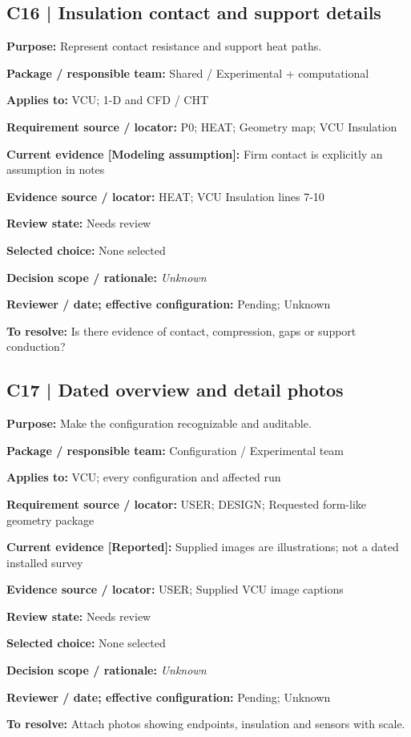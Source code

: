 \documentclass[11pt]{article}
\begin{document}
\begin{minipage}{\textwidth}\small\setlength{\parskip}{2pt}
\subsection*{C16 | Insulation contact and support details}
\textbf{Purpose:} Represent contact resistance and support heat paths.\par
\textbf{Package / responsible team:} Shared / Experimental + computational\par
\textbf{Applies to:} VCU; 1-D and CFD / CHT\par
\textbf{Requirement source / locator:} P0; HEAT; Geometry map; VCU Insulation\par
\textbf{Current evidence [Modeling assumption]:} Firm contact is explicitly an assumption in notes\par
\textbf{Evidence source / locator:} HEAT; VCU Insulation lines 7-10\par
\textbf{Review state:} Needs review\par
\textbf{Selected choice:} None selected\par
\textbf{Decision scope / rationale:} \textit{Unknown}\par
\textbf{Reviewer / date; effective configuration:} Pending; Unknown\par
\textbf{To resolve:} Is there evidence of contact, compression, gaps or support conduction?\par
\end{minipage}\par\vspace{5pt}
\begin{minipage}{\textwidth}\small\setlength{\parskip}{2pt}
\subsection*{C17 | Dated overview and detail photos}
\textbf{Purpose:} Make the configuration recognizable and auditable.\par
\textbf{Package / responsible team:} Configuration / Experimental team\par
\textbf{Applies to:} VCU; every configuration and affected run\par
\textbf{Requirement source / locator:} USER; DESIGN; Requested form-like geometry package\par
\textbf{Current evidence [Reported]:} Supplied images are illustrations; not a dated installed survey\par
\textbf{Evidence source / locator:} USER; Supplied VCU image captions\par
\textbf{Review state:} Needs review\par
\textbf{Selected choice:} None selected\par
\textbf{Decision scope / rationale:} \textit{Unknown}\par
\textbf{Reviewer / date; effective configuration:} Pending; Unknown\par
\textbf{To resolve:} Attach photos showing endpoints, insulation and sensors with scale.\par
\end{minipage}\par\vspace{5pt}
\end{document}
